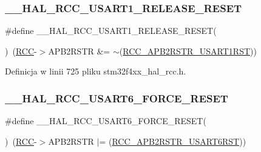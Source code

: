 \subsubsection{\texorpdfstring{\+\_\+\+\_\+\+H\+A\+L\+\_\+\+R\+C\+C\+\_\+\+U\+S\+A\+R\+T1\+\_\+\+R\+E\+L\+E\+A\+S\+E\+\_\+\+R\+E\+S\+ET}{\_\_HAL\_RCC\_USART1\_RELEASE\_RESET}}
{\footnotesize\ttfamily \#define \+\_\+\+\_\+\+H\+A\+L\+\_\+\+R\+C\+C\+\_\+\+U\+S\+A\+R\+T1\+\_\+\+R\+E\+L\+E\+A\+S\+E\+\_\+\+R\+E\+S\+ET(\begin{DoxyParamCaption}{ }\end{DoxyParamCaption})~(\hyperlink{group___peripheral__declaration_ga74944438a086975793d26ae48d5882d4}{R\+CC}-\/$>$A\+P\+B2\+R\+S\+TR \&= $\sim$(\hyperlink{group___peripheral___registers___bits___definition_gae7ae8e338b3b42ad037e9e5b6eeb2c41}{R\+C\+C\+\_\+\+A\+P\+B2\+R\+S\+T\+R\+\_\+\+U\+S\+A\+R\+T1\+R\+ST}))}



Definicja w linii 725 pliku stm32f4xx\+\_\+hal\+\_\+rcc.\+h.

\mbox{\label{group___r_c_c___a_p_b2___force___release___reset_ga36242e7bdc7abbbdc33c06e72c4b45c7}} 
\subsubsection{\texorpdfstring{\+\_\+\+\_\+\+H\+A\+L\+\_\+\+R\+C\+C\+\_\+\+U\+S\+A\+R\+T6\+\_\+\+F\+O\+R\+C\+E\+\_\+\+R\+E\+S\+ET}{\_\_HAL\_RCC\_USART6\_FORCE\_RESET}}
{\footnotesize\ttfamily \#define \+\_\+\+\_\+\+H\+A\+L\+\_\+\+R\+C\+C\+\_\+\+U\+S\+A\+R\+T6\+\_\+\+F\+O\+R\+C\+E\+\_\+\+R\+E\+S\+ET(\begin{DoxyParamCaption}{ }\end{DoxyParamCaption})~(\hyperlink{group___peripheral__declaration_ga74944438a086975793d26ae48d5882d4}{R\+CC}-\/$>$A\+P\+B2\+R\+S\+TR $\vert$= (\hyperlink{group___peripheral___registers___bits___definition_gada1df682293e15ed44b081d626220178}{R\+C\+C\+\_\+\+A\+P\+B2\+R\+S\+T\+R\+\_\+\+U\+S\+A\+R\+T6\+R\+ST}))}



